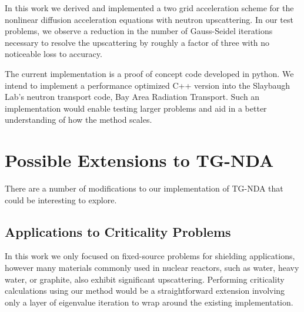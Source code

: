 
In this work we derived and implemented a two grid acceleration scheme for the nonlinear diffusion acceleration equations with neutron upscattering. In our test problems, we observe a reduction in the number of Gauss-Seidel iterations necessary to resolve the upscattering by roughly a factor of three with no noticeable loss to accuracy. 

The current implementation is a proof of concept code developed in python. We intend to implement a performance optimized C++ version into the Slaybaugh Lab's neutron transport code, Bay Area Radiation Transport. Such an implementation would enable testing larger problems and aid in a better understanding of how the method scales.

\section{Possible Extensions to TG-NDA}
There are a number of modifications to our implementation of TG-NDA that could be interesting to explore. 


\subsection{Applications to Criticality Problems}
In this work we only focused on fixed-source problems for shielding applications, however many materials commonly used in nuclear reactors, such as water, heavy water, or graphite, also exhibit significant upscattering. Performing criticality calculations using our method would be a straightforward extension involving only a layer of eigenvalue iteration to wrap around the existing implementation. 


